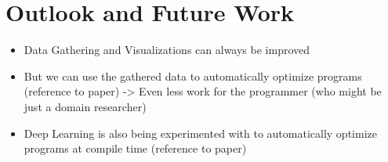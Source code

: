 \section{Outlook and Future Work}\label{sec:outlook}
\begin{itemize}
  \item Data Gathering and Visualizations can always be improved
  \item But we can use the gathered data to automatically optimize programs (reference to paper) -> Even less work for the programmer (who might be just a domain researcher)
  \item Deep Learning is also being experimented with to automatically optimize programs at compile time (reference to paper)
\end{itemize}
